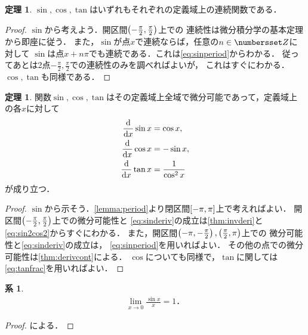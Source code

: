 \documentclass[11pt,a4paper]{ltjsarticle}
\theoremstyle{definition}
\newtheorem{thm}[dfn]{定理}
\newtheorem{coro}[dfn]{系}
\begin{document}
\begin{thm} \label{thm:continus}
  $\sin, \cos, \tan$はいずれもそれぞれの定義域上の連続関数である．
\end{thm}

\begin{proof}
  $\sin$から考えよう．開区間$\interval{op}{-\frac{\pi}{2}, \frac{\pi}{2}}$上での
  連続性は微分積分学の基本定理から即座に従う．
  また，$\sin$が点$x$で連続ならば，任意の$n \in \Zahlen$に対して
  $\sin$は点$x + n\pi$でも連続である．これは\cref{eq:sinperiod}からわかる．
  従ってあとは2点$-\frac{\pi}{2}, \frac{\pi}{2}$での連続性のみを調べればよいが，
  これはすぐにわかる．$\cos, \tan$も同様である．
\end{proof}

\begin{thm} \label{thm:trigoderiv}
  関数$\sin, \cos, \tan$はその定義域上全域で微分可能であって，定義域上の各$x$に対して
  \begin{align}
    \diff*{\sin x}x & = \cos x,
    \label{eq:sinderiv}                    \\
    \diff*{\cos x}x & = - \sin x,
    \label{eq:cosderiv}                    \\
    \diff*{\tan x}x & = \frac{1}{\cos^2 x}
    \label{eq:tanderiv}
  \end{align}
  が成り立つ．
\end{thm}

\begin{proof}
  $\sin$から示そう．\cref{lemma:period}より閉区間$\interval{c}{-\pi, \pi}$上で考えればよい．
  開区間$\interval{op}{-\frac{\pi}{2},\frac{\pi}{2}}$上での微分可能性と
  \cref{eq:sinderiv}の成立は\cref{thm:invderi}と\cref{eq:sin2cos2}からすぐにわかる．
  また，開区間$\interval{op}{-\pi, -\frac{\pi}{2}}, \interval{op}{\frac{\pi}{2}, \pi}$上での
  微分可能性と\cref{eq:sinderiv}の成立は，
  \cref{eq:sinperiod}を用いればよい．
  その他の点での微分可能性は\cref{thm:derivcont}による．
  $\cos$についても同様で，$\tan$に関しては\cref{eq:tanfrac}を用いればよい．
\end{proof}

\begin{coro} \label{coro:sinlim}
  \begin{align}
    \lim_{x \to 0} \frac{\sin x}{x} = 1 \text{．}
    \label{eq:sinlim}
  \end{align}
\end{coro}

\begin{proof}
  による．
\end{proof}
\end{document}
